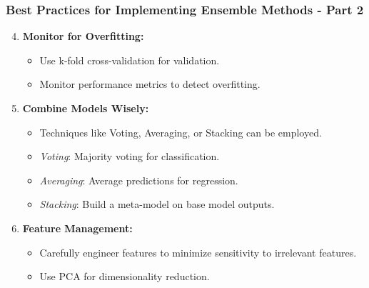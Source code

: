 \documentclass[aspectratio=169]{beamer}
\begin{document}
\begin{frame}
    \frametitle{Best Practices for Implementing Ensemble Methods - Part 2}
    \begin{enumerate}
        \setcounter{enumi}{3}
        \item \textbf{Monitor for Overfitting:}
            \begin{itemize}
                \item Use k-fold cross-validation for validation.
                \item Monitor performance metrics to detect overfitting.
            \end{itemize}
        
        \item \textbf{Combine Models Wisely:}
            \begin{itemize}
                \item Techniques like Voting, Averaging, or Stacking can be employed.
                \item \textit{Voting}: Majority voting for classification.
                \item \textit{Averaging}: Average predictions for regression.
                \item \textit{Stacking}: Build a meta-model on base model outputs.
            \end{itemize}
        
        \item \textbf{Feature Management:}
            \begin{itemize}
                \item Carefully engineer features to minimize sensitivity to irrelevant features.
                \item Use PCA for dimensionality reduction.
            \end{itemize}
    \end{enumerate}
\end{frame}
\end{document}
